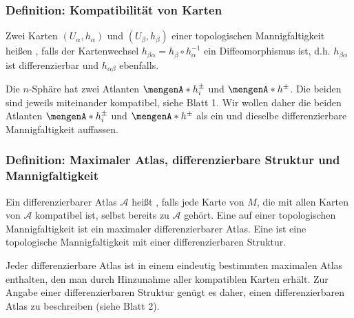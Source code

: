 \subsubsection{Definition: Kompatibilität von Karten} %
\label{ssub:124}
Zwei Karten $(U_\alpha, h_\alpha)$ und $(U_\beta, h_\beta)$ einer topologischen Mannigfaltigkeit heißen , falls der Kartenwechsel $h_{\beta \alpha} = h_\beta \circ h_\alpha ^{-1}$ ein Diffeomorphismus ist, d.h. $h_{\beta \alpha}$ ist differenzierbar und $h_{\alpha \beta}$ ebenfalls.

\bigskip
Die $n$-Sphäre hat zwei Atlanten $\set{h_i^\pm} $ und $\set{h^\pm} $. Die beiden sind jeweils miteinander kompatibel, siehe Blatt 1. Wir wollen daher die beiden Atlanten
$\set{h_i^\pm} $ und $\set{h^\pm} $ als ein und dieselbe differenzierbare Mannigfaltigkeit auffassen.

\subsubsection{Definition: Maximaler Atlas, differenzierbare Struktur und Mannigfaltigkeit} %
\label{ssub:125}
Ein differenzierbarer Atlas $\mathcal{A} $ heißt , falls jede Karte von $M$, die mit allen Karten von $\mathcal{A} $ kompatibel ist, selbst bereits zu 
$\mathcal{A}$ gehört. Eine  auf einer topologischen Mannigfaltigkeit ist ein maximaler differenzierbarer Atlas. Eine 
 ist eine topologische Mannigfaltigkeit mit einer differenzierbaren Struktur.

Jeder differenzierbare Atlas ist in einem eindeutig bestimmten maximalen Atlas enthalten, den man durch Hinzunahme aller kompatiblen Karten erhält. Zur Angabe einer 
differenzierbaren Struktur genügt es daher, einen differenzierbaren Atlas zu beschreiben (siehe Blatt 2).


